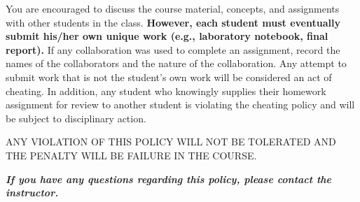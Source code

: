 You are encouraged to discuss the course material, concepts, and assignments with other students in the class. 
\textbf{However, each student must eventually submit his/her own unique work (e.g., laboratory notebook, final report). }
If any collaboration was used to complete an assignment, 
record the names of the collaborators and the nature of the collaboration. 
Any attempt to submit work that is not the student’s own work will be considered an act of cheating. 
In addition, any student who knowingly supplies their homework assignment for review 
to another student is violating the cheating policy and will be subject to disciplinary action.
 
 \begin{tcolorbox}[colback=red!5,colframe=red!75!black]
ANY VIOLATION OF THIS POLICY WILL NOT BE TOLERATED AND THE PENALTY WILL BE FAILURE IN THE COURSE.
\end{tcolorbox}
 
\textbf{\textit{If you have any questions regarding this policy, please contact the instructor.}}


